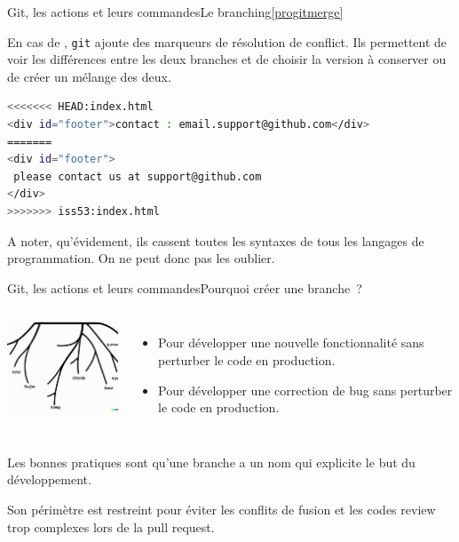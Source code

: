 \documentclass{beamer}
\begin{document}
    \begin{frame}[fragile]{Git, les actions et leurs commandes}{Le branching\cref{progitmerge}}
        \transdissolve

        En cas de , \lstinline{git} ajoute des marqueurs de résolution de conflict.
        Ils permettent de voir les différences entre les deux branches et de choisir la version à conserver ou de créer un mélange des deux.
        \begin{lstlisting}[language=sh]
<<<<<<< HEAD:index.html
<div id="footer">contact : email.support@github.com</div>
=======
<div id="footer">
 please contact us at support@github.com
</div>
>>>>>>> iss53:index.html
        \end{lstlisting}
        A noter, qu'évidement, ils cassent toutes les syntaxes de tous les langages de programmation.
        On ne peut donc pas les oublier.
    \end{frame}

    \begin{frame}{Git, les actions et leurs commandes}{Pourquoi créer une branche~?}
        \transdissolve
        \begin{columns}
            \begin{center}
                \includegraphics[width=5cm]{image/schematic-drawing-of-git-branches}
            \end{center}
            \begin{itemize}
                \item Pour développer une nouvelle fonctionnalité sans perturber le code en production.
                \item Pour développer une correction de bug sans perturber le code en production.
            \end{itemize}
        \end{columns}
        Les bonnes pratiques sont qu'une branche a un nom qui explicite le but du développement.

        Son périmètre est restreint pour éviter les conflits de fusion et les codes review trop complexes lors de la pull request.
    \end{frame}
\end{document}
